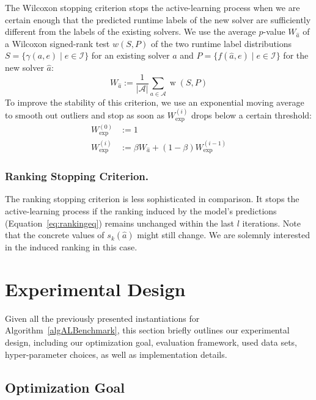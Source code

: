 \documentclass[runningheads]{llncs}
\begin{document}
The Wilcoxon stopping criterion stops the active-learning process when we are certain enough that the predicted runtime labels of the new solver are sufficiently different from the labels of the existing solvers.
We use the average $p$-value $W_{\hat{a}}$ of a Wilcoxon signed-rank test $w(S,P)$ of the two runtime label distributions $S=\{ \gamma(a, e) \mid e \in \mathcal{I} \}$ for an existing solver $a$ and $P=\{ f(\hat a, e) \mid e \in \mathcal{I} \}$ for the new solver $\hat{a}$:
%
\begin{equation*}
  W_{\hat{a}} := \frac{1}{\lvert \mathcal{A} \rvert} \sum_{a \in \mathcal{A}} \operatorname{w}(S, P)
\end{equation*}
%
To improve the stability of this criterion, we use an exponential moving average to smooth out outliers and stop as soon as $W^{(i)}_{\exp}$ drops below a certain threshold:
%
\begin{align*}
	W_{\exp}^{\left(0\right)} &:= 1\\
	W_{\exp}^{\left(i\right)} &:= \beta W_{\hat{a}} + \left(1 - \beta\right) W_{\exp}^{\left(i - 1\right)}
\end{align*}

\subsubsection{Ranking Stopping Criterion.}

The ranking stopping criterion is less sophisticated in comparison.
It stops the active-learning process if the ranking induced by the model's predictions (Equation~\ref{eq:rankingeq}) remains unchanged within the last $l$ iterations.
Note that the concrete values of $s_k(\hat a)$ might still change.
We are solemnly interested in the induced ranking in this case.


\section{Experimental Design}
\label{sec:exdesign}

Given all the previously presented instantiations for Algorithm~\ref{algALBenchmark}, this section briefly outlines our experimental design, including our optimization goal, evaluation framework, used data sets, hyper-parameter choices, as well as implementation details.

\subsection{Optimization Goal}
\label{sec:exdesign:goal}
\end{document}
